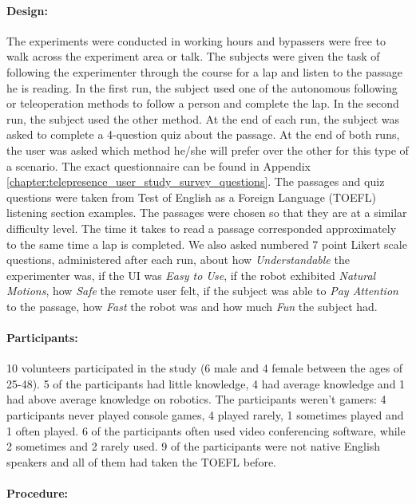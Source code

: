 \paragraph{Design:}
The experiments were conducted in working hours and bypassers were free to walk across the experiment area or talk. The subjects were given the task of following the experimenter through the course for a lap and listen to the passage he is reading. In the first run, the subject used one of the autonomous following or teleoperation methods to follow a person and complete the lap. In the second run, the subject used the other method. At the end of each run, the subject was asked to complete a 4-question quiz about the passage. At the end of both runs, the user was asked which method he/she will prefer over the other for this type of a scenario. The exact questionnaire can be found in Appendix \ref{chapter:telepresence_user_study_survey_questions}. The passages and quiz questions were taken from Test of English as a Foreign Language (TOEFL) listening section examples. The passages were chosen so that they are at a similar difficulty level. The time it takes to read a passage corresponded approximately to the same time a lap is completed. We also asked numbered 7 point Likert scale questions, administered after each run, about how \emph{Understandable} the experimenter was, if the UI was \emph{Easy to Use}, if the robot exhibited \emph {Natural Motions}, how \emph{Safe} the remote user felt, if the subject was able to \emph{Pay Attention} to the passage, how \emph{Fast} the robot was and how much \emph{Fun} the subject had.

\paragraph{Participants:}

10 volunteers participated in the study (6 male and 4 female between the ages of 25-48). 5 of the participants had little knowledge, 4 had average knowledge and 1 had above average knowledge on robotics. The participants weren't gamers: 4 participants never played console games, 4 played rarely, 1 sometimes played and 1 often played. 6 of the participants often used video conferencing software, while 2 sometimes and 2 rarely used. 9 of the participants were not native English speakers and all of them had taken the TOEFL before.

\paragraph{Procedure:}

